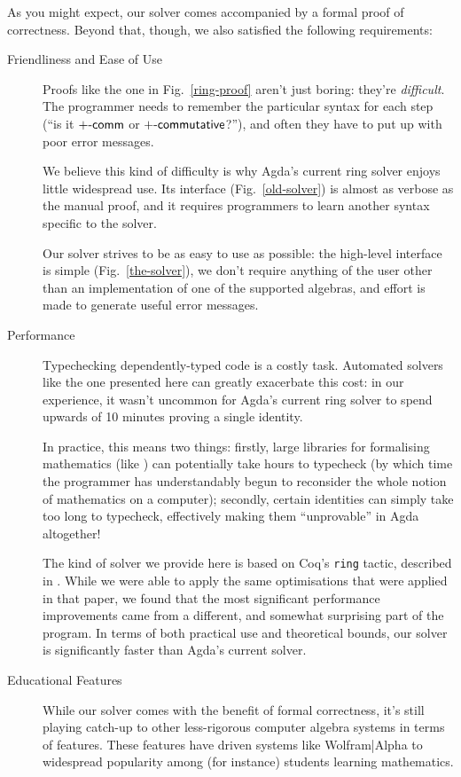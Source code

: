 \documentclass[acmsmall,review,anonymous]{acmart}\settopmatter{printfolios=true,printccs=false,printacmref=false}
\begin{document}
As you might expect, our solver comes accompanied by a formal proof of
correctness. Beyond that, though, we also satisfied the following requirements:
\begin{description}
  \item[Friendliness and Ease of Use] Proofs like the one in
    Fig.~\ref{ring-proof} aren't just boring: they're \emph{difficult}.
    The programmer needs to remember the particular syntax for each step (``is
    it \(\AgdaFunction{+-comm}\) or \(\AgdaFunction{+-commutative}\)?''), and
    often they have to put up with poor error messages.

    We believe this kind of difficulty is why Agda's current ring solver
    \cite{danielsson_agda_2018} enjoys little widespread use. Its interface
    (Fig.~\ref{old-solver}) is almost as verbose as the manual proof, and it
    requires programmers to learn another syntax specific to the solver.

    Our solver strives to be as easy to use as possible: the high-level
    interface is simple (Fig.~\ref{the-solver}), we don't require anything
    of the user other than an implementation of one of the supported algebras,
    and effort is made to generate useful error messages.
  \item[Performance] Typechecking dependently-typed code is a costly task.
    Automated solvers like the one presented here can greatly exacerbate this
    cost: in our experience, it wasn't uncommon for Agda's current ring solver
    to spend upwards of 10 minutes proving a single identity.

    In practice, this means two things: firstly, large libraries for formalising
    mathematics (like \citet{meshveliani_docon-provable_2018}) can potentially
    take hours to typecheck (by which time the programmer has understandably
    begun to reconsider the whole notion of mathematics on a computer);
    secondly, certain identities can simply take too long to typecheck,
    effectively making them ``unprovable'' in Agda altogether!

    The kind of solver we provide here is based on Coq's
    \cite{the_coq_development_team_2018_1219885} \verb+ring+ tactic, described
    in \citet{gregoire_proving_2005}. While we were able to apply the same
    optimisations that were applied in that paper, we found that the most
    significant performance improvements came from a different, and somewhat
    surprising part of the program. In terms of both practical use and
    theoretical bounds, our solver is significantly faster than Agda's current
    solver.
  \item[Educational Features] While our solver comes with the benefit of formal
    correctness, it's still playing catch-up to other less-rigorous computer
    algebra systems in terms of features. These features have driven systems
    like Wolfram|Alpha \cite{wolfram_research_inc._wolframalpha_2019} to
    widespread popularity among (for instance) students learning mathematics.


\end{description}
\end{document}
